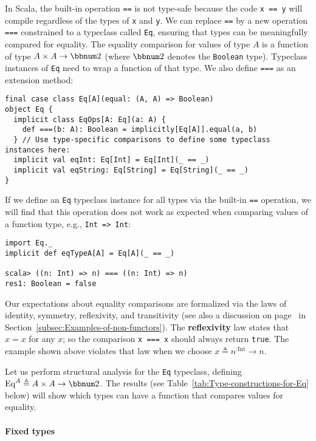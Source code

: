In Scala, the built-in operation \lstinline!==! is not type-safe
because the code \lstinline!x == y! will compile regardless of the
types of \lstinline!x! and \lstinline!y!. We can replace \lstinline!==!
by a new operation \lstinline!===! constrained to a typeclass called
\lstinline!Eq!, ensuring that types can be meaningfully compared
for equality. The equality comparison for values of type $A$ is a
function of type $A\times A\rightarrow\bbnum 2$ (where $\bbnum 2$
denotes the \lstinline!Boolean! type). Typeclass instances of \lstinline!Eq!
need to wrap a function of that type. We also define \lstinline!===!
as an extension method:
\begin{lstlisting}
final case class Eq[A](equal: (A, A) => Boolean)
object Eq {
  implicit class EqOps[A: Eq](a: A) {
    def ===(b: A): Boolean = implicitly[Eq[A]].equal(a, b)
  } // Use type-specific comparisons to define some typeclass instances here:
  implicit val eqInt: Eq[Int] = Eq[Int](_ == _)
  implicit val eqString: Eq[String] = Eq[String](_ == _)
}
\end{lstlisting}
If we define an \lstinline!Eq! typeclass instance for all types via
the built-in \lstinline!==! operation, we will find that this operation
does not work as expected when comparing values of a function type,
e.g., \lstinline!Int => Int!: 
\begin{lstlisting}
import Eq._
implicit def eqTypeA[A] = Eq[A](_ == _)

scala> ((n: Int) => n) === ((n: Int) => n)
res1: Boolean = false 
\end{lstlisting}
Our expectations about equality comparisons are formalized via the
laws of identity, symmetry, reflexivity, and transitivity (see also
a discussion on page~\pageref{par:label-equality-laws} in Section~\ref{subsec:Examples-of-non-functors}).
The \textbf{reflexivity} law states that $x=x$
for any $x$; so the comparison \lstinline!x === x! should always
return \lstinline!true!. The example shown above violates that law
when we choose $x\triangleq n^{:\text{Int}}\rightarrow n$.

Let us perform structural analysis for the \lstinline!Eq! typeclass,
defining $\text{Eq}^{A}\triangleq A\times A\rightarrow\bbnum 2$.
The results (see Table~\ref{tab:Type-constructions-for-Eq} below)
will show which types can have a function that compares values for
equality.

\paragraph{Fixed types}

